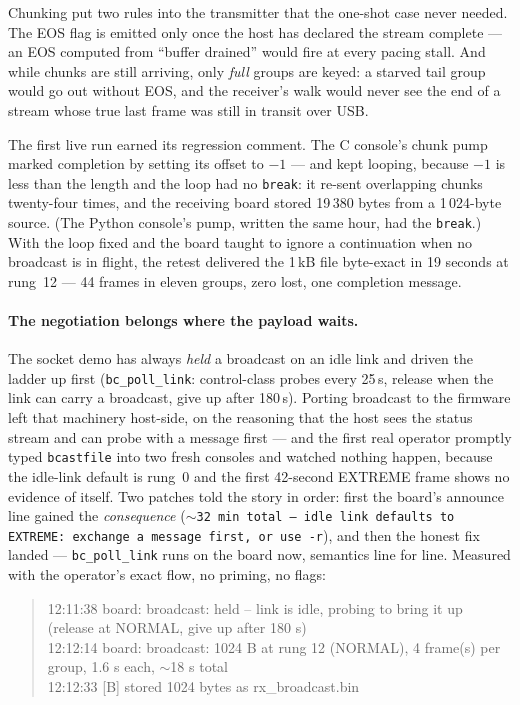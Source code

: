Chunking put two rules into the transmitter that the one-shot case
never needed. The EOS flag is emitted only once the host has declared
the stream complete --- an EOS computed from ``buffer drained'' would
fire at every pacing stall. And while chunks are still arriving, only
\emph{full} groups are keyed: a starved tail group would go out
without EOS, and the receiver's walk would never see the end of a
stream whose true last frame was still in transit over USB.

The first live run earned its regression comment. The C console's
chunk pump marked completion by setting its offset to $-1$ --- and
kept looping, because $-1$ is less than the length and the loop had no
\texttt{break}: it re-sent overlapping chunks twenty-four times, and
the receiving board stored 19\,380 bytes from a 1\,024-byte source.
(The Python console's pump, written the same hour, had the
\texttt{break}.) With the loop fixed and the board taught to ignore a
continuation when no broadcast is in flight, the retest delivered the
1\,kB file byte-exact in 19 seconds at rung~12 --- 44 frames in
eleven groups, zero lost, one completion message.

\paragraph{The negotiation belongs where the payload waits.} The
socket demo has always \emph{held} a broadcast on an idle link and
driven the ladder up first (\texttt{bc\_poll\_link}: control-class
probes every 25\,s, release when the link can carry a broadcast, give
up after 180\,s). Porting broadcast to the firmware left that
machinery host-side, on the reasoning that the host sees the status
stream and can probe with a message first --- and the first real
operator promptly typed \texttt{bcastfile} into two fresh consoles
and watched nothing happen, because the idle-link default is rung~0
and the first 42-second EXTREME frame shows no evidence of itself. Two
patches told the story in order: first the board's announce line
gained the \emph{consequence} (\texttt{$\sim$32 min total -- idle
link defaults to EXTREME: exchange a message first, or use -r}), and
then the honest fix landed --- \texttt{bc\_poll\_link} runs on the
board now, semantics line for line. Measured with the operator's exact
flow, no priming, no flags:

\begin{quote}\ttfamily\small
12:11:38 board: broadcast: held -- link is idle, probing to bring it
up (release at NORMAL, give up after 180 s)\\
12:12:14 board: broadcast: 1024 B at rung 12 (NORMAL), 4 frame(s) per
group, 1.6 s each, $\sim$18 s total\\
12:12:33 [B] stored 1024 bytes as rx\_broadcast.bin
\end{quote}

